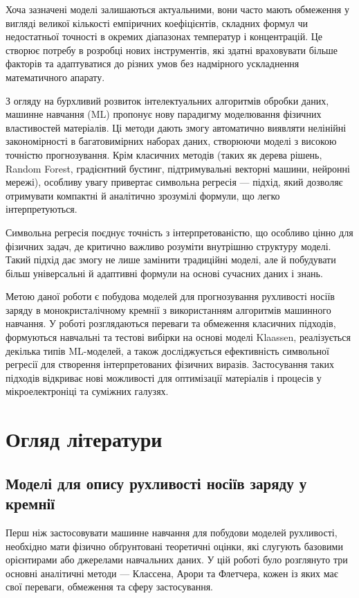 \documentclass[14pt,a4paper,titlepage,oneside]{book}
\numberwithin{equation}{part}
\begin{document}
Хоча зазначені моделі залишаються актуальними, вони часто мають обмеження у вигляді великої кількості емпіричних коефіцієнтів, складних формул чи недостатньої точності в окремих діапазонах температур і концентрацій. Це створює потребу в розробці нових інструментів, які здатні враховувати більше факторів та адаптуватися до різних умов без надмірного ускладнення математичного апарату.

З огляду на бурхливий розвиток інтелектуальних алгоритмів обробки даних, машинне навчання (ML) пропонує нову парадигму моделювання фізичних властивостей матеріалів. Ці методи дають змогу автоматично виявляти нелінійні закономірності в багатовимірних наборах даних, створюючи моделі з високою точністю прогнозування. Крім класичних методів (таких як дерева рішень, Random Forest, градієнтний бустинг, підтримувальні векторні машини, нейронні мережі), особливу увагу привертає символьна регресія — підхід, який дозволяє отримувати компактні й аналітично зрозумілі формули, що легко інтерпретуються.

Символьна регресія поєднує точність з інтерпретованістю, що особливо цінно для фізичних задач, де критично важливо розуміти внутрішню структуру моделі. Такий підхід дає змогу не лише замінити традиційні моделі, але й побудувати більш універсальні й адаптивні формули на основі сучасних даних і знань.

Метою даної роботи є побудова моделей для прогнозування рухливості носіїв заряду в монокристалічному кремнії з використанням алгоритмів машинного навчання. У роботі розглядаються переваги та обмеження класичних підходів, формуються навчальні та тестові вибірки на основі моделі Klaassen, реалізується декілька типів ML-моделей, а також досліджується ефективність символьної регресії для створення інтерпретованих фізичних виразів. Застосування таких підходів відкриває нові можливості для оптимізації матеріалів і процесів у мікроелектроніці та суміжних галузях.

\chapter{Огляд літератури}
\section{Моделі для опису рухливості носіїв заряду у кремнії}\label{Teor}
Перш ніж застосовувати машинне навчання для побудови моделей рухливості, необхідно мати фізично обґрунтовані теоретичні оцінки, які слугують базовими орієнтирами або джерелами навчальних даних. У цій роботі було розглянуто три основні аналітичні методи — Классена, Арори та Флетчера, кожен із яких має свої переваги, обмеження та сферу застосування.
\end{document}
